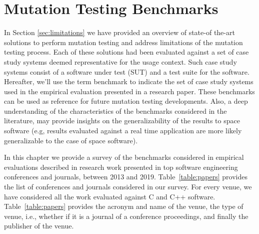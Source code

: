 
\chapter{Mutation Testing Benchmarks}
\label{chapter:industry}

In Section \ref{sec:limitations} we have provided an overview of state-of the-art solutions to perform mutation testing and address limitations of the mutation testing process.
Each of these solutions had been evaluated against a set of case study systems deemed representative for the usage context. Such case study systems consist of a software under test (SUT) and a test suite for the software.
Hereafter, we'll use the term benchmark to indicate the set of case study systems used in the empirical evaluation presented in a research paper.
These benchmarks can be used as reference for future mutation testing developments. 
Also, a deep understanding of the characteristics of the benchmarks considered in the literature, may provide insights on the generalizability of the results to space software (e.g, results evaluated against a real time application are more likely generalizable to the case of space software).




In this chapter we provide a survey of the benchmarks considered in empirical evaluations described in research work presented in top software engineering conferences and journals, between 2013 and 2019. Table~\ref{table:papers} provides the list of conferences and journals considered in our survey. For every venue, we have considered all the work evaluated against C and C++ software. Table~\ref{table:papers} provides the acronym and name of the venue, the type of venue, i.e., whether if it is a journal of a conference proceedings, and finally the publisher of the venue. 




